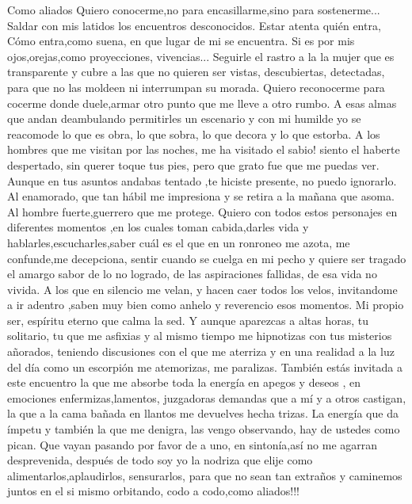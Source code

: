 \documentclass[12pt, a4paper, twoside]{book} %
\begin{document}
Como aliados
Quiero conocerme,no para encasillarme,sino para sostenerme...
Saldar con mis latidos los encuentros desconocidos.
Estar atenta quién entra, Cómo entra,como suena, en que lugar de mi se encuentra.
Si es por mis ojos,orejas,como proyecciones, vivencias...
Seguirle el rastro a la la mujer que es transparente y cubre a las que no quieren ser vistas, descubiertas, detectadas, para que no las moldeen ni interrumpan su morada.
Quiero reconocerme para cocerme donde duele,armar otro punto que me lleve a otro rumbo.
A esas almas que andan deambulando permitirles un escenario y con mi humilde yo se reacomode lo que es obra, lo que sobra, lo que decora y lo que estorba.
A los hombres que me visitan por las noches, me ha visitado el sabio! siento el haberte despertado, sin querer toque tus pies, pero que grato fue que me puedas ver.
Aunque en tus asuntos andabas tentado ,te hiciste presente, no puedo ignorarlo.
Al enamorado, que tan hábil me impresiona y se retira a la mañana que asoma.
Al hombre fuerte,guerrero que me protege.
Quiero con todos estos personajes en diferentes momentos ,en los cuales  toman cabida,darles vida y hablarles,escucharles,saber cuál es el que en un ronroneo me azota, me confunde,me decepciona, sentir cuando se cuelga en mi pecho y quiere ser tragado el amargo sabor de lo no logrado, de las aspiraciones fallidas, de esa vida no vivida.
A los que en silencio me velan, y  hacen caer todos los velos, invitandome a ir adentro ,saben muy bien como anhelo y reverencio esos momentos. Mi propio ser, espíritu eterno que calma la sed.
Y aunque aparezcas a altas horas, tu solitario, tu que me asfixias y al mismo tiempo me hipnotizas con tus misterios añorados, teniendo discusiones con el que me aterriza y en una realidad  a la luz del día como un escorpión me atemorizas, me paralizas.
También estás invitada a este encuentro la que me absorbe toda la energía en apegos y deseos , en emociones enfermizas,lamentos, juzgadoras demandas que a mí y a otros castigan, la que a la cama bañada en llantos me devuelves hecha trizas.
La energía que da ímpetu y también la que me denigra, las vengo observando, hay de ustedes como pican.
Que vayan pasando por favor de a uno, en sintonía,así no me agarran desprevenida, después de todo soy yo la nodriza que elije como alimentarlos,aplaudirlos, sensurarlos, para que no sean tan extraños y caminemos juntos en el si mismo orbitando, codo a codo,como aliados!!!
\end{document}
